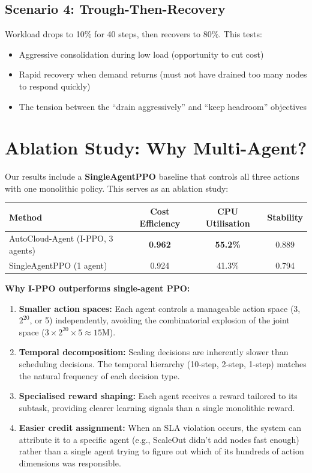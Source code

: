 \documentclass[11pt,a4paper]{article}
\begin{document}
\subsection{Scenario 4: Trough-Then-Recovery}

Workload drops to 10\% for 40 steps, then recovers to 80\%. This tests:
\begin{itemize}[leftmargin=2em]
  \item Aggressive consolidation during low load (opportunity to cut cost)
  \item Rapid recovery when demand returns (must not have drained too many
        nodes to respond quickly)
  \item The tension between the ``drain aggressively'' and ``keep headroom''
        objectives
\end{itemize}


\section{Ablation Study: Why Multi-Agent?}\label{sec:ablation}


Our results include a \textbf{SingleAgentPPO} baseline that controls all three
actions with one monolithic policy. This serves as an ablation study:

\begin{center}
\begin{tabular}{lccc}
\toprule
\textbf{Method} & \textbf{Cost Efficiency} & \textbf{CPU Utilisation} &
\textbf{Stability} \\
\midrule
AutoCloud-Agent (I-PPO, 3 agents) & \textbf{0.962} & \textbf{55.2\%} & 0.889 \\
SingleAgentPPO (1 agent) & 0.924 & 41.3\% & 0.794 \\
\bottomrule
\end{tabular}
\end{center}

\noindent
\textbf{Why I-PPO outperforms single-agent PPO:}
\begin{enumerate}[leftmargin=2em]
  \item \textbf{Smaller action spaces:} Each agent controls a manageable action
        space (3, $2^{20}$, or 5) independently, avoiding the combinatorial
        explosion of the joint space ($3 \times 2^{20} \times 5 \approx 15$M).
  \item \textbf{Temporal decomposition:} Scaling decisions are inherently
        slower than scheduling decisions. The temporal hierarchy (10-step, 2-step,
        1-step) matches the natural frequency of each decision type.
  \item \textbf{Specialised reward shaping:} Each agent receives a reward
        tailored to its subtask, providing clearer learning signals than a
        single monolithic reward.
  \item \textbf{Easier credit assignment:} When an SLA violation occurs, the
        system can attribute it to a specific agent (e.g., ScaleOut didn't add
        nodes fast enough) rather than a single agent trying to figure out which
        of its hundreds of action dimensions was responsible.
\end{enumerate}
\end{document}
